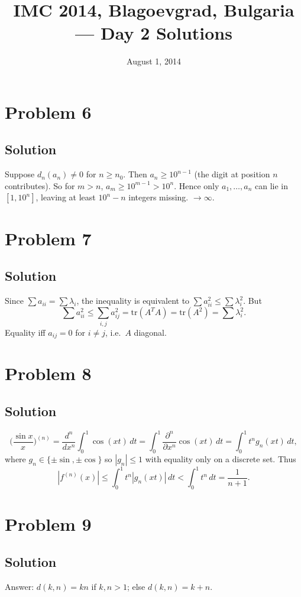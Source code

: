 \documentclass{article}
\title{IMC 2014, Blagoevgrad, Bulgaria --- Day 2 Solutions}
\date{August 1, 2014}
\begin{document}
\maketitle

\section*{Problem 6}
\subsection*{Solution}
Suppose $d_n(a_n) \ne 0$ for $n \ge n_0$. Then $a_n \ge 10^{n-1}$ (the digit at position $n$ contributes). So for $m > n$, $a_m \ge 10^{m-1} > 10^n$. Hence only $a_1, \dots, a_n$ can lie in $[1, 10^n]$, leaving at least $10^n - n$ integers missing. $\to \infty$.

\section*{Problem 7}
\subsection*{Solution}
Since $\sum a_{ii} = \sum \lambda_i$, the inequality is equivalent to $\sum a_{ii}^2 \le \sum \lambda_i^2$. But
\[ \sum a_{ii}^2 \le \sum_{i,j} a_{ij}^2 = \mathrm{tr}(A^T A) = \mathrm{tr}(A^2) = \sum \lambda_i^2. \]
Equality iff $a_{ij} = 0$ for $i \ne j$, i.e.\ $A$ diagonal.

\section*{Problem 8}
\subsection*{Solution}
\[ \Big(\frac{\sin x}{x}\Big)^{(n)} = \frac{d^n}{dx^n}\int_0^1 \cos(xt)\,dt = \int_0^1 \frac{\partial^n}{\partial x^n}\cos(xt)\,dt = \int_0^1 t^n g_n(xt)\,dt, \]
where $g_n \in \{\pm\sin, \pm\cos\}$ so $|g_n| \le 1$ with equality only on a discrete set. Thus
\[ |f^{(n)}(x)| \le \int_0^1 t^n |g_n(xt)|\,dt < \int_0^1 t^n\,dt = \frac{1}{n+1}. \]

\section*{Problem 9}
\subsection*{Solution}
Answer: $d(k, n) = kn$ if $k, n > 1$; else $d(k, n) = k + n$.
\end{document}
